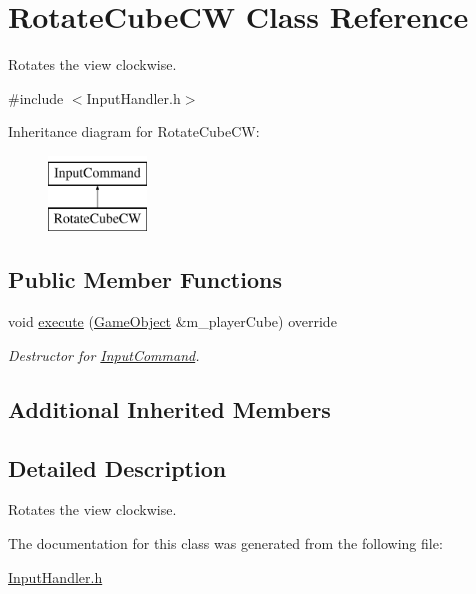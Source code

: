 \hypertarget{class_rotate_cube_c_w}{}\section{Rotate\+Cube\+CW Class Reference}
\label{class_rotate_cube_c_w}


Rotates the view clockwise.  




{\ttfamily \#include $<$Input\+Handler.\+h$>$}

Inheritance diagram for Rotate\+Cube\+CW\+:\begin{figure}[H]
\begin{center}
\leavevmode
\includegraphics[height=2.000000cm]{class_rotate_cube_c_w}
\end{center}
\end{figure}
\subsection*{Public Member Functions}
\begin{DoxyCompactItemize}
\item 
\mbox{\label{class_rotate_cube_c_w_a68def2eaad22be10f80878447f2a958d}} 
void \mbox{\hyperlink{class_rotate_cube_c_w_a68def2eaad22be10f80878447f2a958d}{execute}} (\mbox{\hyperlink{class_game_object}{Game\+Object}} \&m\+\_\+player\+Cube) override
\begin{DoxyCompactList}\small\item\em Destructor for \mbox{\hyperlink{class_input_command}{Input\+Command}}. \end{DoxyCompactList}\end{DoxyCompactItemize}
\subsection*{Additional Inherited Members}


\subsection{Detailed Description}
Rotates the view clockwise. 

The documentation for this class was generated from the following file\+:\begin{DoxyCompactItemize}
\item 
\mbox{\hyperlink{_input_handler_8h}{Input\+Handler.\+h}}\end{DoxyCompactItemize}
